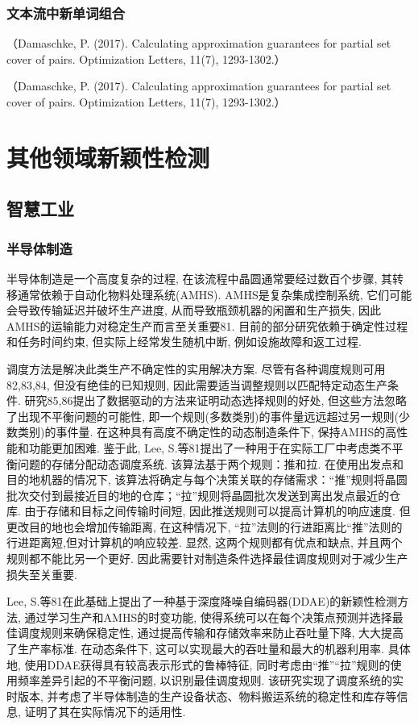 \documentclass{Style/aas}
\begin{document}
\begin{multicols}{2}
  \subsubsection{文本流中新单词组合}
  （Damaschke, P. (2017). Calculating approximation guarantees for partial set cover of pairs. Optimization Letters, 11(7), 1293-1302.）

（Damaschke, P. (2017). Calculating approximation guarantees for partial set cover of pairs. Optimization Letters, 11(7), 1293-1302.）





\section{其他领域新颖性检测}
\subsection{智慧工业}
\subsubsection{半导体制造}
半导体制造是一个高度复杂的过程, 在该流程中晶圆通常要经过数百个步骤, 其转移通常依赖于自动化物料处理系统(AMHS). AMHS是复杂集成控制系统, 它们可能会导致传输延迟并破坏生产进度, 从而导致瓶颈机器的闲置和生产损失, 因此AMHS的运输能力对稳定生产而言至关重要81. 目前的部分研究依赖于确定性过程和任务时间约束, 但实际上经常发生随机中断, 例如设施故障和返工过程. 

调度方法是解决此类生产不确定性的实用解决方案. 尽管有各种调度规则可用82,83,84, 但没有绝佳的已知规则, 因此需要适当调整规则以匹配特定动态生产条件. 研究85,86提出了数据驱动的方法来证明动态选择规则的好处, 但这些方法忽略了出现不平衡问题的可能性, 即一个规则(多数类别)的事件量远远超过另一规则(少数类别)的事件量. 在这种具有高度不确定性的动态制造条件下, 保持AMHS的高性能和功能更加困难. 鉴于此, Lee, S.等81提出了一种用于在实际工厂中考虑类不平衡问题的存储分配动态调度系统. 该算法基于两个规则：推和拉. 在使用出发点和目的地机器的情况下, 该算法将确定与每个决策关联的存储需求：“推”规则将晶圆批次交付到最接近目的地的仓库；“拉”规则将晶圆批次发送到离出发点最近的仓库. 由于存储和目标之间传输时间短, 因此推送规则可以提高计算机的响应速度. 但更改目的地也会增加传输距离, 在这种情况下, “拉”法则的行进距离比“推”法则的行进距离短,但对计算机的响应较差. 显然, 这两个规则都有优点和缺点, 并且两个规则都不能比另一个更好. 因此需要针对制造条件选择最佳调度规则对于减少生产损失至关重要. 

Lee, S.等81在此基础上提出了一种基于深度降噪自编码器(DDAE)的新颖性检测方法, 通过学习生产和AMHS的时变功能, 使得系统可以在每个决策点预测并选择最佳调度规则来确保稳定性, 通过提高传输和存储效率来防止吞吐量下降, 大大提高了生产率标准. 在动态条件下, 这可以实现最大的吞吐量和最大的机器利用率. 具体地, 使用DDAE获得具有较高表示形式的鲁棒特征, 同时考虑由“推”“拉”规则的使用频率差异引起的不平衡问题, 以识别最佳调度规则. 该研究实现了调度系统的实时版本, 并考虑了半导体制造的生产设备状态、物料搬运系统的稳定性和库存等信息, 证明了其在实际情况下的适用性.


\end{multicols}
\end{document}
